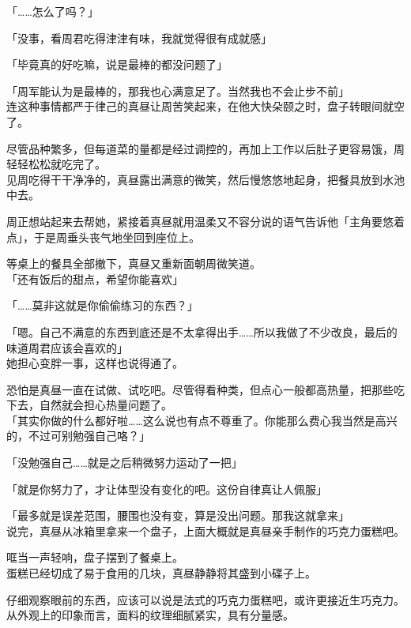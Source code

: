 「……怎么了吗？」

「没事，看周君吃得津津有味，我就觉得很有成就感」

「毕竟真的好吃嘛，说是最棒的都没问题了」

「周军能认为是最棒的，那我也心满意足了。当然我也不会止步不前」\\

连这种事情都严于律己的真昼让周苦笑起来，在他大快朵颐之时，盘子转眼间就空了。

尽管品种繁多，但每道菜的量都是经过调控的，再加上工作以后肚子更容易饿，周轻轻松松就吃完了。\\

见周吃得干干净净的，真昼露出满意的微笑，然后慢悠悠地起身，把餐具放到水池中去。

周正想站起来去帮她，紧接着真昼就用温柔又不容分说的语气告诉他「主角要悠着点」，于是周垂头丧气地坐回到座位上。

等桌上的餐具全部撤下，真昼又重新面朝周微笑道。\\

「还有饭后的甜点，希望你能喜欢」

「……莫非这就是你偷偷练习的东西？」

「嗯。自己不满意的东西到底还是不太拿得出手……所以我做了不少改良，最后的味道周君应该会喜欢的」\\

她担心变胖一事，这样也说得通了。

恐怕是真昼一直在试做、试吃吧。尽管得看种类，但点心一般都高热量，把那些吃下去，自然就会担心热量问题了。\\

「其实你做的什么都好啦……这么说也有点不尊重了。你能那么费心我当然是高兴的，不过可别勉强自己咯？」

「没勉强自己……就是之后稍微努力运动了一把」

「就是你努力了，才让体型没有变化的吧。这份自律真让人佩服」

「最多就是误差范围，腰围也没有变，算是没出问题。那我这就拿来」\\

说完，真昼从冰箱里拿来一个盘子，上面大概就是真昼亲手制作的巧克力蛋糕吧。

哐当一声轻响，盘子摆到了餐桌上。\\

蛋糕已经切成了易于食用的几块，真昼静静将其盛到小碟子上。

仔细观察眼前的东西，应该可以说是法式的巧克力蛋糕吧，或许更接近生巧克力。从外观上的印象而言，面料的纹理细腻紧实，具有分量感。\\

